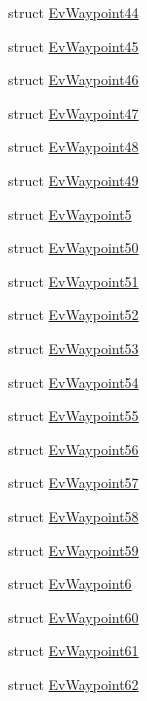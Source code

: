 \begin{DoxyCompactItemize}
struct \hyperlink{structmove__base__z__client_1_1EvWaypoint44}{Ev\+Waypoint44}
\item 
struct \hyperlink{structmove__base__z__client_1_1EvWaypoint45}{Ev\+Waypoint45}
\item 
struct \hyperlink{structmove__base__z__client_1_1EvWaypoint46}{Ev\+Waypoint46}
\item 
struct \hyperlink{structmove__base__z__client_1_1EvWaypoint47}{Ev\+Waypoint47}
\item 
struct \hyperlink{structmove__base__z__client_1_1EvWaypoint48}{Ev\+Waypoint48}
\item 
struct \hyperlink{structmove__base__z__client_1_1EvWaypoint49}{Ev\+Waypoint49}
\item 
struct \hyperlink{structmove__base__z__client_1_1EvWaypoint5}{Ev\+Waypoint5}
\item 
struct \hyperlink{structmove__base__z__client_1_1EvWaypoint50}{Ev\+Waypoint50}
\item 
struct \hyperlink{structmove__base__z__client_1_1EvWaypoint51}{Ev\+Waypoint51}
\item 
struct \hyperlink{structmove__base__z__client_1_1EvWaypoint52}{Ev\+Waypoint52}
\item 
struct \hyperlink{structmove__base__z__client_1_1EvWaypoint53}{Ev\+Waypoint53}
\item 
struct \hyperlink{structmove__base__z__client_1_1EvWaypoint54}{Ev\+Waypoint54}
\item 
struct \hyperlink{structmove__base__z__client_1_1EvWaypoint55}{Ev\+Waypoint55}
\item 
struct \hyperlink{structmove__base__z__client_1_1EvWaypoint56}{Ev\+Waypoint56}
\item 
struct \hyperlink{structmove__base__z__client_1_1EvWaypoint57}{Ev\+Waypoint57}
\item 
struct \hyperlink{structmove__base__z__client_1_1EvWaypoint58}{Ev\+Waypoint58}
\item 
struct \hyperlink{structmove__base__z__client_1_1EvWaypoint59}{Ev\+Waypoint59}
\item 
struct \hyperlink{structmove__base__z__client_1_1EvWaypoint6}{Ev\+Waypoint6}
\item 
struct \hyperlink{structmove__base__z__client_1_1EvWaypoint60}{Ev\+Waypoint60}
\item 
struct \hyperlink{structmove__base__z__client_1_1EvWaypoint61}{Ev\+Waypoint61}
\item 
struct \hyperlink{structmove__base__z__client_1_1EvWaypoint62}{Ev\+Waypoint62}
\item 

\end{DoxyCompactItemize}

